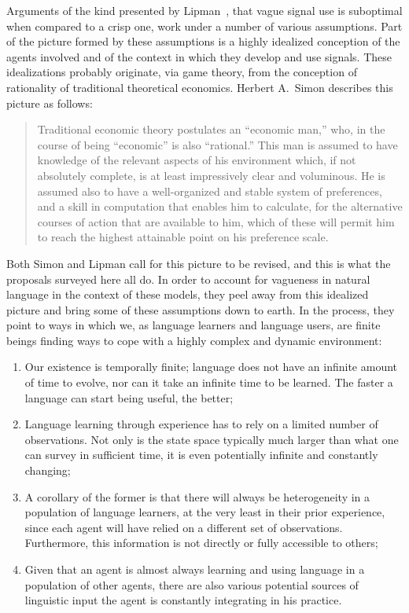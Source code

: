 \documentclass[a4paper]{article}
\begin{document}
Arguments of the kind presented by Lipman~\parencite*{lipman_why_2009}, that vague signal use is suboptimal when compared to a crisp one, work under a number of various assumptions.
Part of the picture formed by these assumptions is a highly idealized conception of the agents involved and of the context in which they develop and use signals.
These idealizations probably originate, via game theory, from the conception of rationality of traditional theoretical economics.
Herbert A.~Simon describes this picture as follows:
\begin{quote}
Traditional economic theory postulates an ``economic man,'' who, in the course of being ``economic'' is also ``rational.''
This man is assumed to have knowledge of the relevant aspects of his environment which, if not absolutely complete, is at least impressively clear and voluminous.
He is assumed also to have a well-organized and stable system of preferences, and a skill in computation that enables him to calculate, for the alternative courses of action that are available to him, which of these will permit him to reach the highest attainable point on his preference scale.%
~\parencite[99]{simon_behavioral_1955}
\end{quote}
Both Simon and Lipman call for this picture to be revised, and this is what the proposals surveyed here all do.
In order to account for vagueness in natural language in the context of these models, they peel away from this idealized picture and bring some of these assumptions down to earth.
In the process, they point to ways in which we, as language learners and language users, are finite beings finding ways to cope with a highly complex and dynamic environment:
\begin{enumerate}
\item Our existence is temporally finite; language does not have an infinite amount of time to evolve, nor can it take an infinite time to be learned. The faster a language can start being useful, the better;
\item Language learning through experience has to rely on a limited number of observations. Not only is the state space typically much larger than what one can survey in sufficient time, it is even potentially infinite and constantly changing;
\item A corollary of the former is that there will always be heterogeneity in a population of language learners, at the very least in their prior experience, since each agent will have relied on a different set of observations. Furthermore, this information is not directly or fully accessible to others;
\item Given that an agent is almost always learning and using language in a population of other agents, there are also various potential sources of linguistic input the agent is constantly integrating in his practice.
\end{enumerate}
\end{document}
